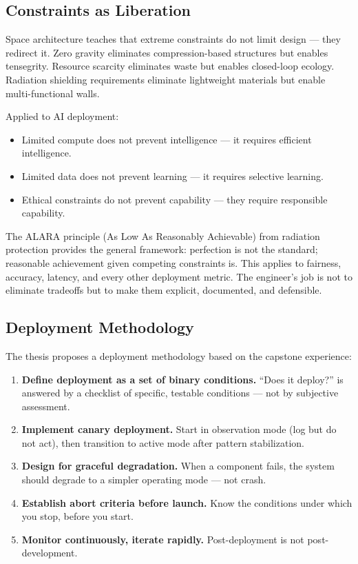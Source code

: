 \documentclass[11pt,a4paper]{article}
\begin{document}
\subsection{Constraints as Liberation}

Space architecture teaches that extreme constraints do not limit design --- they redirect it. Zero gravity eliminates compression-based structures but enables tensegrity. Resource scarcity eliminates waste but enables closed-loop ecology. Radiation shielding requirements eliminate lightweight materials but enable multi-functional walls.

Applied to AI deployment:

\begin{itemize}[leftmargin=*, itemsep=2pt]
  \item Limited compute does not prevent intelligence --- it requires efficient intelligence.
  \item Limited data does not prevent learning --- it requires selective learning.
  \item Ethical constraints do not prevent capability --- they require responsible capability.
\end{itemize}

The ALARA principle (As Low As Reasonably Achievable) from radiation protection provides the general framework: perfection is not the standard; reasonable achievement given competing constraints is. This applies to fairness, accuracy, latency, and every other deployment metric. The engineer's job is not to eliminate tradeoffs but to make them explicit, documented, and defensible.

\subsection{Deployment Methodology}

The thesis proposes a deployment methodology based on the capstone experience:

\begin{enumerate}[leftmargin=*, itemsep=2pt]
  \item \textbf{Define deployment as a set of binary conditions.} ``Does it deploy?'' is answered by a checklist of specific, testable conditions --- not by subjective assessment.
  \item \textbf{Implement canary deployment.} Start in observation mode (log but do not act), then transition to active mode after pattern stabilization.
  \item \textbf{Design for graceful degradation.} When a component fails, the system should degrade to a simpler operating mode --- not crash.
  \item \textbf{Establish abort criteria before launch.} Know the conditions under which you stop, before you start.
  \item \textbf{Monitor continuously, iterate rapidly.} Post-deployment is not post-development.
\end{enumerate}
\end{document}
